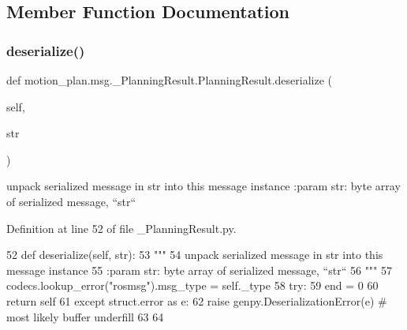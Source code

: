 \subsection{Member Function Documentation}
\mbox{\label{classmotion__plan_1_1msg_1_1__PlanningResult_1_1PlanningResult_a489458d17451b5d892c77b08047b416f}} 
\subsubsection{\texorpdfstring{deserialize()}{deserialize()}}
{\footnotesize\ttfamily def motion\+\_\+plan.\+msg.\+\_\+\+Planning\+Result.\+Planning\+Result.\+deserialize (\begin{DoxyParamCaption}\item[{}]{self,  }\item[{}]{str }\end{DoxyParamCaption})}

\begin{DoxyVerb}unpack serialized message in str into this message instance
:param str: byte array of serialized message, ``str``
\end{DoxyVerb}
 

Definition at line 52 of file \+\_\+\+Planning\+Result.\+py.


\begin{DoxyCode}
52   \textcolor{keyword}{def }deserialize(self, str):
53     \textcolor{stringliteral}{"""}
54 \textcolor{stringliteral}{    unpack serialized message in str into this message instance}
55 \textcolor{stringliteral}{    :param str: byte array of serialized message, ``str``}
56 \textcolor{stringliteral}{    """}
57     codecs.lookup\_error(\textcolor{stringliteral}{"rosmsg"}).msg\_type = self.\_type
58     \textcolor{keywordflow}{try}:
59       end = 0
60       \textcolor{keywordflow}{return} self
61     \textcolor{keywordflow}{except} struct.error \textcolor{keyword}{as} e:
62       \textcolor{keywordflow}{raise} genpy.DeserializationError(e)  \textcolor{comment}{# most likely buffer underfill}
63 
64 
\end{DoxyCode}
\mbox{\label{classmotion__plan_1_1msg_1_1__PlanningResult_1_1PlanningResult_a33fea39d6f70464b017008de819f794b}} 
